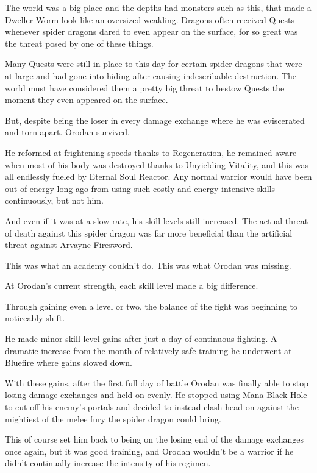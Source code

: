 \documentclass[a4paper,10pt]{book}
\begin{document}
The world was a big place and the depths had monsters such as this, that made a Dweller Worm look like an oversized weakling. Dragons often received Quests whenever spider dragons dared to even appear on the surface, for so great was the threat posed by one of these things.\par
Many Quests were still in place to this day for certain spider dragons that were at large and had gone into hiding after causing indescribable destruction. The world must have considered them a pretty big threat to bestow Quests the moment they even appeared on the surface.\par
But, despite being the loser in every damage exchange where he was eviscerated and torn apart. Orodan survived.\par
He reformed at frightening speeds thanks to Regeneration, he remained aware when most of his body was destroyed thanks to Unyielding Vitality, and this was all endlessly fueled by Eternal Soul Reactor. Any normal warrior would have been out of energy long ago from using such costly and energy-intensive skills continuously, but not him.\par
And even if it was at a slow rate, his skill levels still increased. The actual threat of death against this spider dragon was far more beneficial than the artificial threat against Arvayne Firesword.\par
This was what an academy couldn’t do. This was what Orodan was missing.\par
At Orodan’s current strength, each skill level made a big difference.\par
Through gaining even a level or two, the balance of the fight was beginning to noticeably shift.\par
He made minor skill level gains after just a day of continuous fighting. A dramatic increase from the month of relatively safe training he underwent at Bluefire where gains slowed down.\par
With these gains, after the first full day of battle Orodan was finally able to stop losing damage exchanges and held on evenly. He stopped using Mana Black Hole to cut off his enemy’s portals and decided to instead clash head on against the mightiest of the melee fury the spider dragon could bring.\par
This of course set him back to being on the losing end of the damage exchanges once again, but it was good training, and Orodan wouldn’t be a warrior if he didn’t continually increase the intensity of his regimen.\par
\end{document}
